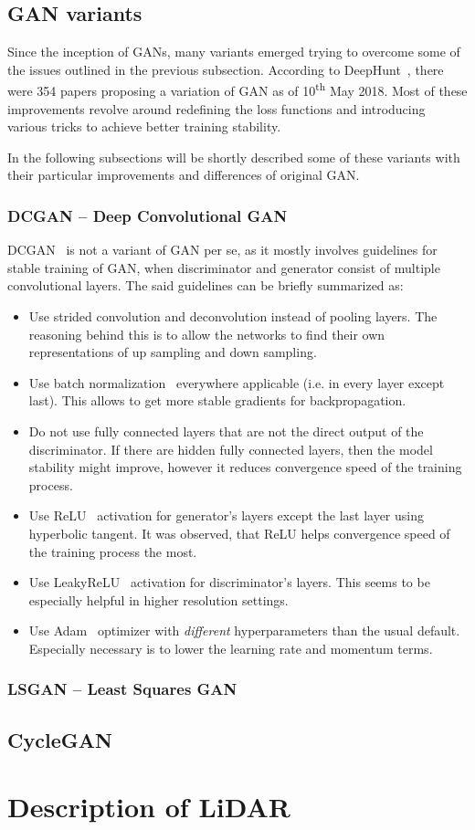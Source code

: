 \subsection{GAN variants}

Since the inception of GANs, many variants emerged trying to overcome some of the issues outlined in the previous subsection. According to DeepHunt~\cite{deephunt}, there were 354 papers proposing a variation of GAN as of 10\textsuperscript{th} May 2018. Most of these improvements revolve around redefining the loss functions and introducing various tricks to achieve better training stability.

In the following subsections will be shortly described some of these variants with their particular improvements and differences of original GAN.

\subsubsection{DCGAN -- Deep Convolutional GAN}
DCGAN~\cite{dcgan} is not a variant of GAN per se, as it mostly involves guidelines for stable training of GAN, when discriminator and generator consist of multiple convolutional layers. The said guidelines can be briefly summarized as:
\begin{itemize}
\item Use strided convolution and deconvolution instead of pooling layers. The reasoning behind this is to allow the networks to find their own representations of up sampling and down sampling.
\item Use batch normalization~\cite{batchnorm} everywhere applicable (i.e. in every layer except last). This allows to get more stable gradients for backpropagation.
\item Do not use fully connected layers that are not the direct output of the discriminator. If there are hidden fully connected layers, then the model stability might improve, however it reduces convergence speed of the training process.
\item Use ReLU~\cite{relu} activation for generator's layers except the last layer using hyperbolic tangent. It was observed, that ReLU helps convergence speed of the training process the most.
\item Use LeakyReLU~\cite{leakyrelu} activation for discriminator's layers. This seems to be especially helpful in higher resolution settings.
\item Use Adam~\cite{adam} optimizer with {\em different} hyperparameters than the usual default. Especially necessary is to lower the learning rate and momentum terms.
\end{itemize}

\subsubsection{LSGAN -- Least Squares GAN}

\subsection{CycleGAN} \label{cyclegan}

\section{Description of LiDAR}

